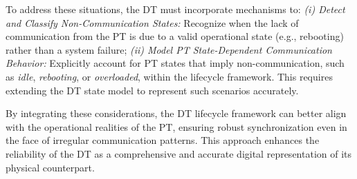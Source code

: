 To address these situations, the DT must incorporate mechanisms to: \textit{(i) Detect and Classify Non-Communication States:} Recognize when the lack of communication from the PT is due to a valid operational state (e.g., rebooting) rather than a system failure; \textit{(ii) Model PT State-Dependent Communication Behavior:} Explicitly account for PT states that imply non-communication, such as \textit{idle}, \textit{rebooting}, or \textit{overloaded}, within the lifecycle framework. This requires extending the DT state model to represent such scenarios accurately.  

By integrating these considerations, the DT lifecycle framework can better align with the operational realities of the PT, ensuring robust synchronization even in the face of irregular communication patterns. This approach enhances the reliability of the DT as a comprehensive and accurate digital representation of its physical counterpart.



